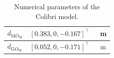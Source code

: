 \begin{table}[ht]
\begin{tabular}{|l|c|c|}
       $d_{\text{M}O_{\text{W}}}$  & $[0.383,0,-0.167]^\top$ & \SI{}{\meter}\\
      \hline
       $d_{\text{G}O_{\text{W}}}$  & $[0.052,0,-0.171]^\top$ & \SI{}{\meter}\\
      \hline
    \end{tabular}
    \caption{\label{tab:pars} Numerical parameters of the Colibri model.}
\end{table}

